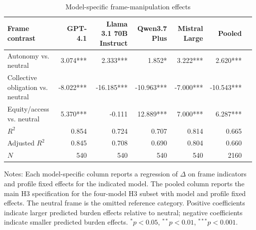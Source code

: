 \begin{table}[htbp]
\centering
\caption{Model-specific frame-manipulation effects}
\label{tab:h3_model_specific_effects}
\begin{tabular}{lrrrrrr}
\toprule
Frame contrast & GPT-4.1 & Llama 3.1 70B Instruct & Qwen3.7 Plus & Mistral Large & Pooled \\
\midrule
Autonomy vs. neutral & 3.074*** & 2.333*** & 1.852* & 3.222*** & 2.620*** \\
Collective obligation vs. neutral & -8.022*** & -16.185*** & -10.963*** & -7.000*** & -10.543*** \\
Equity/access vs. neutral & 5.370*** & -0.111 & 12.889*** & 7.000*** & 6.287*** \\
\midrule
\(R^2\) & 0.854 & 0.724 & 0.707 & 0.814 & 0.665 \\
Adjusted \(R^2\) & 0.845 & 0.708 & 0.690 & 0.804 & 0.660 \\
\(N\) & 540 & 540 & 540 & 540 & 2160 \\
\bottomrule
\end{tabular}
\begin{flushleft}
\footnotesize Notes: Each model-specific column reports a regression of \(\Delta\) on frame indicators and profile fixed effects for the indicated model. The pooled column reports the main H3 specification for the four-model H3 subset with model and profile fixed effects. The neutral frame is the omitted reference category. Positive coefficients indicate larger predicted burden effects relative to neutral; negative coefficients indicate smaller predicted burden effects. \({}^{*}p<0.05\), \({}^{**}p<0.01\), \({}^{***}p<0.001\).
\end{flushleft}
\end{table}
